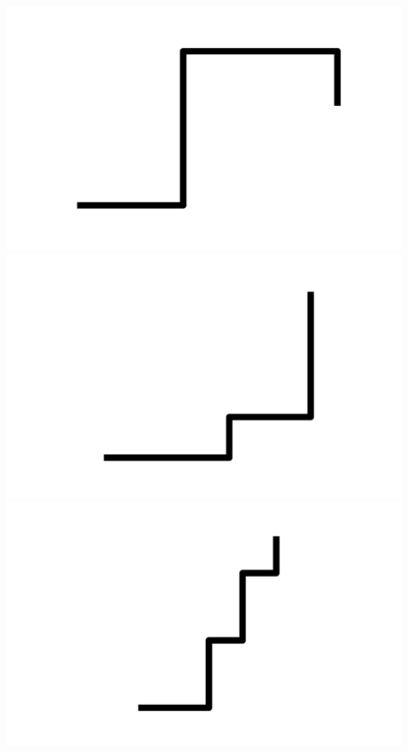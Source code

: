 \documentclass[]{report}
\begin{document}
\includegraphics[scale=.1]{pictures/21/state_cluster_shapes_46.pdf} 
\includegraphics[scale=.1]{pictures/21/state_cluster_shapes_47.pdf} 
\includegraphics[scale=.1]{pictures/21/state_cluster_shapes_48.pdf} 
\end{document}
